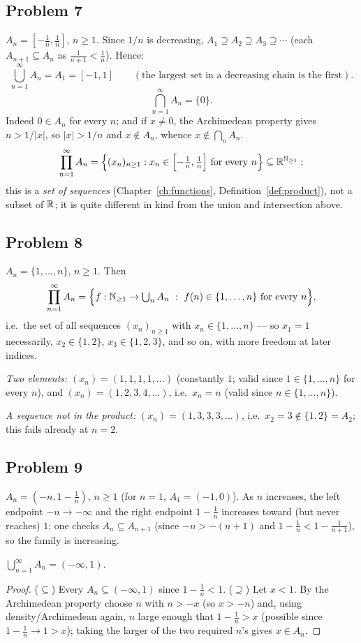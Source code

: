 \subsection*{Problem 7}
$A_n=[-\tfrac1n,\tfrac1n]$, $n\ge1$. Since $1/n$ is decreasing, $A_1\supseteq A_2\supseteq A_3\supseteq\cdots$ (each $A_{n+1}\subseteq A_n$ as $\frac1{n+1}<\frac1n$). Hence:
\[
\bigcup_{n=1}^\infty A_n=A_1=[-1,1]\qquad(\text{the largest set in a decreasing chain is the first}).
\]
\[
\bigcap_{n=1}^\infty A_n=\{0\}.
\]
Indeed $0\in A_n$ for every $n$; and if $x\ne0$, the Archimedean property gives $n>1/|x|$, so $|x|>1/n$ and $x\notin A_n$, whence $x\notin\bigcap_nA_n$.
\[
\prod_{n=1}^\infty A_n=\Bigl\{(x_n)_{n\ge1}:x_n\in\Bigl[-\tfrac1n,\tfrac1n\Bigr]\text{ for every }n\Bigr\}\subseteq\mathbb{R}^{\mathbb{N}_{\ge1}}:
\]
this is a \emph{set of sequences} (Chapter~\ref{ch:functions}, Definition~\ref{def:product}), not a subset of $\mathbb{R}$; it is quite different in kind from the union and intersection above.

\subsection*{Problem 8}
$A_n=\{1,\dots,n\}$, $n\ge1$. Then
\[
\prod_{n=1}^\infty A_n=\Bigl\{f:\N_{\ge1}\to\textstyle\bigcup_nA_n\ :\ f(n)\in\{1,\dots,n\}\text{ for every }n\Bigr\},
\]
i.e.\ the set of all sequences $(x_n)_{n\ge1}$ with $x_n\in\{1,\dots,n\}$ — so $x_1=1$ necessarily, $x_2\in\{1,2\}$, $x_3\in\{1,2,3\}$, and so on, with more freedom at later indices.

\emph{Two elements:} $(x_n)=(1,1,1,1,\dots)$ (constantly $1$; valid since $1\in\{1,\dots,n\}$ for every $n$), and $(x_n)=(1,2,3,4,\dots)$, i.e.\ $x_n=n$ (valid since $n\in\{1,\dots,n\}$).

\emph{A sequence not in the product:} $(x_n)=(1,3,3,3,\dots)$, i.e.\ $x_2=3\notin\{1,2\}=A_2$; this fails already at $n=2$.

\subsection*{Problem 9}
$A_n=(-n,1-\tfrac1n)$, $n\ge1$ (for $n=1$, $A_1=(-1,0)$). As $n$ increases, the left endpoint $-n\to-\infty$ and the right endpoint $1-\frac1n$ increases toward (but never reaches) $1$; one checks $A_n\subseteq A_{n+1}$ (since $-n>-(n+1)$ and $1-\frac1n<1-\frac1{n+1}$), so the family is increasing.
\begin{claim}
	$\bigcup_{n=1}^\infty A_n=(-\infty,1)$.
\end{claim}
\begin{proof}
	($\subseteq$) Every $A_n\subseteq(-\infty,1)$ since $1-\frac1n<1$. ($\supseteq$) Let $x<1$. By the Archimedean property choose $n$ with $n>-x$ (so $x>-n$) and, using density/Archimedean again, $n$ large enough that $1-\frac1n>x$ (possible since $1-\frac1n\to1>x$); taking the larger of the two required $n$'s gives $x\in A_n$.
\end{proof}

